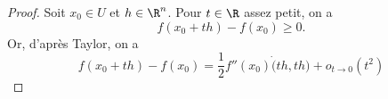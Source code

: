 \begin{proof}
    Soit \(x_0\in U\) et \(h\in\R^n\). Pour \(t\in\R\) assez petit, on a
    \begin{equation*}
        f(x_0+th) -f(x_0)\geq 0.
    \end{equation*}
    Or, d'après Taylor, on a
    \begin{equation*}
        f(x_0+th) -f(x_0) = \frac12 f''(x_0)\dot(th, th) + o_{t\to 0}(t^2) %
    \end{equation*}
\end{proof}